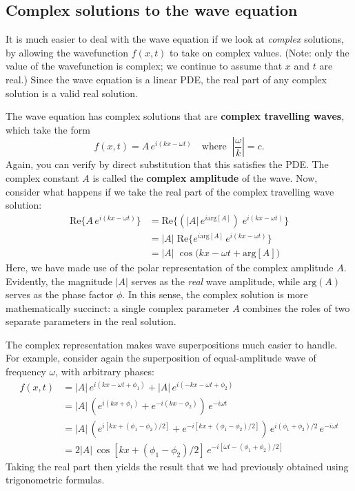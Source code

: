 \documentclass[10pt,a4paper]{article}
\begin{document}
\subsection{Complex solutions to the wave equation}
\label{complex-solutions-to-the-wave-equation}

It is much easier to deal with the wave equation if we look at
\emph{complex} solutions, by allowing the wavefunction $f(x,t)$ to
take on complex values. (Note: only the value of the wavefunction is
complex; we continue to assume that $x$ and $t$ are real.) Since the
wave equation is a linear PDE, the real part of any complex solution
is a valid real solution.

The wave equation has complex solutions that are \textbf{complex
  travelling waves}, which take the form
\begin{equation}
  f(x,t) = A \, e^{i(kx - \omega t)} \quad\mathrm{where}\;\; \left|\frac{\omega}{k}\right| = c.
\end{equation}
Again, you can verify by direct substitution that this satisfies the
PDE. The complex constant $A$ is called the \textbf{complex amplitude}
of the wave. Now, consider what happens if we take the real part of
the complex travelling wave solution:
\begin{align}
  \mathrm{Re}\Big\{A \, e^{i(kx - \omega t)}\Big\}
  &= \mathrm{Re}\Big\{ \left(\big|A\big|\, e^{i\mathrm{arg}[A]}\right) \; e^{i(kx - \omega t)}\Big\} \\
  &= \big|A\big|\; \mathrm{Re}\Big\{ e^{i\mathrm{arg}[A]} \, e^{i(kx - \omega t)}\Big\} \\
  &= \big|A\big|\; \cos\big(kx - \omega t + \mathrm{arg}[A]\big)
\end{align}
Here, we have made use of the polar representation of the complex
amplitude $A$. Evidently, the magnitude $|A|$ serves as the
\emph{real} wave amplitude, while $\mathrm{arg}(A)$ serves as the
phase factor $\phi$. In this sense, the complex solution is more
mathematically succinct: a single complex parameter $A$ combines the
roles of two separate parameters in the real solution.

The complex representation makes wave superpositions much easier to
handle. For example, consider again the superposition of
equal-amplitude wave of frequency $\omega$, with arbitrary phases:
\begin{align}
  f(x,t) &= \big|A\big| \, e^{i(kx - \omega t + \phi_1)}
  + \big|A\big| \, e^{i(-kx - \omega t + \phi_2)} \\
  &= \big|A\big|\, \left(e^{i(kx + \phi_1)}
  + e^{-i(kx - \phi_2)}\right)\, e^{-i\omega t} \\
  &= \big|A\big|\, \left(e^{i[kx + (\phi_1-\phi_2)/2]} + e^{-i[kx + (\phi_1 - \phi_2)/2]}\right)\,
  e^{i(\phi_1 + \phi_2)/2} \,e^{-i\omega t} \\
  &= 2\big|A\big|\, \cos\left[kx + (\phi_1-\phi_2)/2\right] \,
  e^{-i[\omega t -(\phi_1+\phi_2)/2]}
\end{align}
Taking the real part then yields the result that we had previously
obtained using trigonometric formulas.
\end{document}

